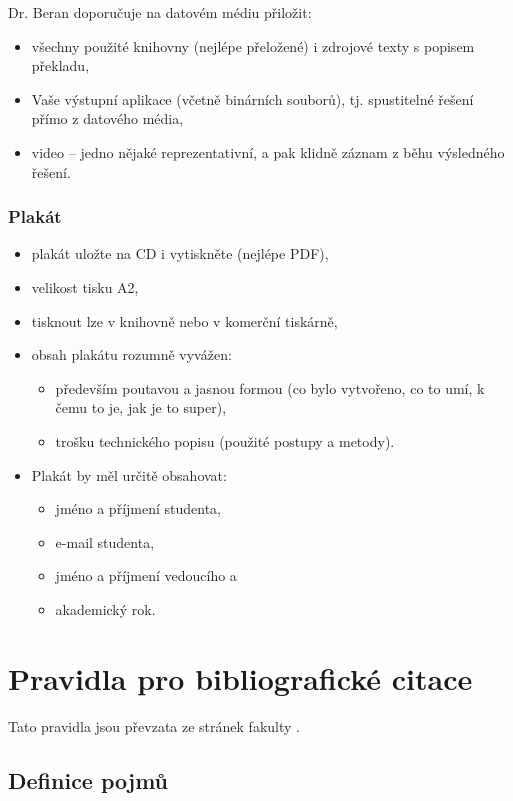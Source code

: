 \noindent Dr. Beran doporučuje na datovém médiu přiložit:
\begin{itemize}
  \item{všechny použité knihovny (nejlépe přeložené) i zdrojové texty s popisem překladu,}
  \item{Vaše výstupní aplikace (včetně binárních souborů), tj. spustitelné řešení přímo z datového média,}
  \item{video -- jedno nějaké reprezentativní, a pak klidně záznam z běhu výsledného řešení.}
\end{itemize}

\subsection*{Plakát}
\begin{itemize}
  \item{plakát uložte na CD i vytiskněte (nejlépe PDF),}
  \item{velikost tisku A2,}
  \item{tisknout lze v knihovně nebo v komerční tiskárně,}
  \item{obsah plakátu rozumně vyvážen:
  \begin{itemize}
    \item{především poutavou a jasnou formou (co bylo vytvořeno, co to umí, k čemu to je, jak je to super),}
    \item{trošku technického popisu (použité postupy a metody).}
  \end{itemize}}
  \item{Plakát by měl určitě obsahovat:
  	\begin{itemize}
      \item jméno a příjmení studenta,
      \item e-mail studenta,
      \item jméno a příjmení vedoucího a
      \item akademický rok.
  	\end{itemize}
    }
\end{itemize}


\chapter{Pravidla pro bibliografické citace}
\label{citace}

Tato pravidla jsou převzata ze stránek fakulty \cite{citace}.

\section{Definice pojmů}

